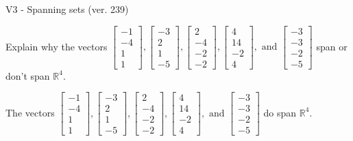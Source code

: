 \begin{exercise}
  \begin{exerciseTitle}V3 - Spanning sets (ver. 239)\end{exerciseTitle}
  \begin{exerciseStatement}
    Explain why the vectors \(\left[\begin{array}{r}
-1 \\
-4 \\
1 \\
1
\end{array}\right] , \left[\begin{array}{r}
-3 \\
2 \\
1 \\
-5
\end{array}\right] , \left[\begin{array}{r}
2 \\
-4 \\
-2 \\
-2
\end{array}\right] , \left[\begin{array}{r}
4 \\
14 \\
-2 \\
4
\end{array}\right] , \text{ and } \left[\begin{array}{r}
-3 \\
-3 \\
-2 \\
-5
\end{array}\right]\) span or don't span \(\mathbb{R}^4\). 
	


  \end{exerciseStatement}
  \begin{exerciseAnswer}
   The vectors \(\left[\begin{array}{r}
-1 \\
-4 \\
1 \\
1
\end{array}\right] , \left[\begin{array}{r}
-3 \\
2 \\
1 \\
-5
\end{array}\right] , \left[\begin{array}{r}
2 \\
-4 \\
-2 \\
-2
\end{array}\right] , \left[\begin{array}{r}
4 \\
14 \\
-2 \\
4
\end{array}\right] , \text{ and } \left[\begin{array}{r}
-3 \\
-3 \\
-2 \\
-5
\end{array}\right]\) 
  	 do  
	span \(\mathbb{R}^4\).
  



\end{exerciseAnswer}
\end{exercise}
